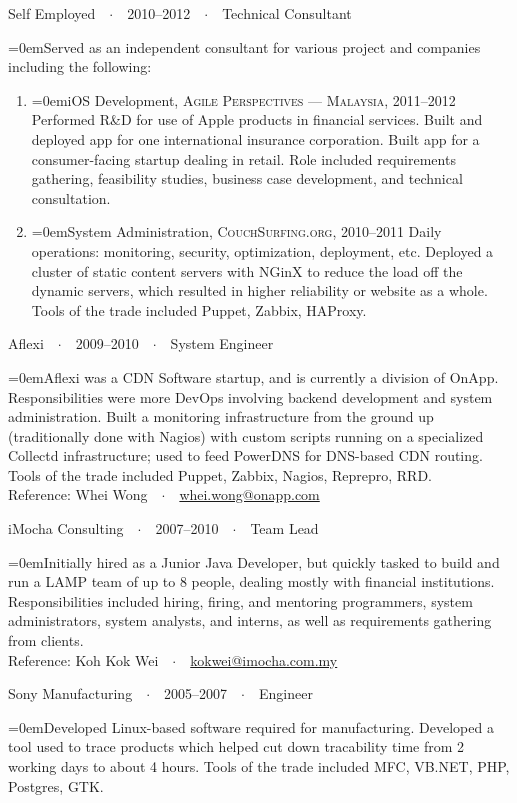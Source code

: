 \documentclass[a4paper]{scrartcl}
\newcommand{\Description}[1]{\hangindent=0em\hangafter=0\noindent\footnotesize{#1}\par\normalsize\vspace{1em}} %
\newcommand{\Redvline}[0]{\vspace{0.5em}\noindent{\color{ThemeColor}\rule{16cm}{0.4pt}}}
\newcommand{\NewBlock}[3]{
    #1\ \ $\cdotp$\ \ #2\ \ $\cdotp$\ \ #3}
\begin{document}
\NewBlock{Self Employed}{2010--2012}{Technical Consultant}

\Description{Served as an independent consultant for various project and companies including the following:}
\begin{enumerate}
\item[] \Description{iOS Development, \textsc{Agile Perspectives --- Malaysia}, 2011--2012
\newline
Performed R\&D for use of Apple products in financial services. Built and deployed app for one international insurance corporation. Built app for a consumer-facing startup dealing in retail. Role included requirements gathering, feasibility studies, business case development, and technical consultation. }

\item[] \Description{System Administration, \textsc{CouchSurfing.org}, 2010--2011
\newline
Daily operations: monitoring, security, optimization, deployment, etc. Deployed a cluster of static content servers with NGinX to reduce the load off the dynamic servers, which resulted in higher reliability or website as a whole. Tools of the trade included Puppet, Zabbix, HAProxy. }
\end{enumerate}

\NewBlock{Aflexi}{2009--2010}{System Engineer}

\Description{Aflexi was a CDN Software startup, and is currently a division of OnApp. Responsibilities were more DevOps involving backend development and system administration. Built a monitoring infrastructure from the ground up (traditionally done with Nagios) with custom scripts running on a specialized Collectd infrastructure; used to feed PowerDNS for DNS-based CDN routing. Tools of the trade included Puppet, Zabbix, Nagios, Reprepro, RRD.
\\Reference: Whei Wong\ \ $\cdotp$\ \ \href{mailto:whei.wong@onapp.com}{whei.wong@onapp.com}}


\NewBlock{iMocha Consulting}{2007--2010}{Team Lead}

\Description{Initially hired as a Junior Java Developer, but quickly tasked to build and run a LAMP team of up to 8 people, dealing mostly with financial institutions. Responsibilities included hiring, firing, and mentoring programmers, system administrators, system analysts, and interns, as well as requirements gathering from clients.
\\Reference: Koh Kok Wei\ \ $\cdotp$\ \ \href{mailto:kokwei@imocha.com.my}{kokwei@imocha.com.my}}

\NewBlock{Sony Manufacturing}{2005--2007}{Engineer}

\Description{Developed Linux-based software required for manufacturing. Developed a tool used to trace products which helped cut down tracability time from 2 working days to about 4 hours. Tools of the trade included MFC, VB.NET, PHP, Postgres, GTK.}
\Redvline

\Redvline
\end{document}
